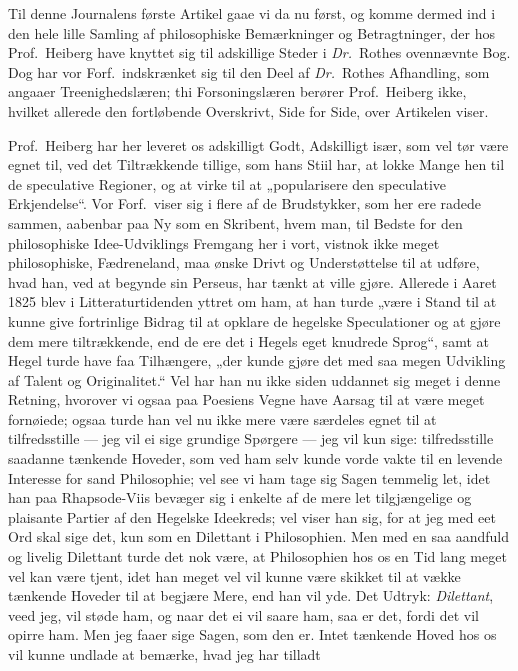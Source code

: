 \documentclass[12pt,a4paper]{book}
\newcommand{\apage}[1]{\marginnote{\footnotesize\textit{[#1]}}}
\begin{document}
Til denne Journalens første Artikel gaae vi da nu først, og komme dermed
ind i den hele lille Samling af philosophiske Bemærkninger og
Betragtninger, der hos Prof.\ Heiberg have knyttet sig til adskillige
Steder i \textit{Dr.}\ Rothes ovennævnte Bog. Dog har vor Forf.\ indskrænket sig
til den Deel af \textit{Dr.}\ Rothes Afhandling, som angaaer Treenighedslæren; thi
Forsoningslæren berører Prof.\ Heiberg ikke, hvilket allerede den
fortløbende Overskrivt, Side for Side, over Artikelen viser.

Prof.\ Heiberg har her leveret os adskilligt Godt, Adskilligt især, \apage{8} som
vel tør være egnet til, ved det Tiltrækkende tillige, som hans Stiil har,
at lokke Mange hen til de speculative Regioner, og at virke til at
„popularisere den speculative Erkjendelse“. Vor Forf.\ viser sig i flere
af de Brudstykker, som her ere radede sammen, aabenbar paa Ny som en
Skribent, hvem man, til Bedste for den philosophiske Idee-Udviklings
Fremgang her i vort, vistnok ikke meget philosophiske, Fædreneland, maa
ønske Drivt og Understøttelse til at udføre, hvad han, ved at begynde sin
Perseus, har tænkt at ville gjøre. Allerede i Aaret 1825 blev i
Litteraturtidenden yttret om ham, at han turde „være i Stand til at kunne
give fortrinlige Bidrag til at opklare de hegelske Speculationer og at
gjøre dem mere tiltrækkende, end de ere det i Hegels eget knudrede Sprog“,
samt at Hegel turde have faa Tilhængere, „der kunde gjøre det med saa megen
Udvikling af Talent og Originalitet.“ Vel har han nu ikke siden uddannet
sig meget i denne Retning, hvorover vi ogsaa paa Poesiens Vegne have
Aarsag til at være meget fornøiede; ogsaa turde han vel nu ikke mere være
særdeles egnet til at tilfredsstille --- jeg vil ei sige grundige Spørgere
--- jeg vil kun sige: tilfredsstille saadanne tænkende Hoveder, som ved ham
selv kunde vorde vakte til en levende Interesse for sand Philosophie; vel
see vi ham tage sig Sagen temmelig let, idet han paa Rhapsode-Viis bevæger
sig i enkelte af de mere let tilgjængelige og plaisante Partier af den
Hegelske Ideekreds; vel viser han sig, for at jeg med eet Ord skal sige
det, kun som en Dilettant i Philosophien. Men med en saa aandfuld og
livelig Dilettant turde det nok være, at Philosophien hos os en Tid lang
meget vel kan være tjent, idet han meget vel vil kunne være skikket til at
vække tænkende Hoveder til at begjære Mere, end han vil yde. Det Udtryk:
\emph{Dilettant}, veed jeg, vil støde ham, og naar det ei vil saare ham, saa er
det, fordi det vil opirre ham. Men jeg faaer sige Sagen, som den er. Intet
tænkende Hoved hos os vil kunne undlade at bemærke, hvad jeg har tilladt
\end{document}

